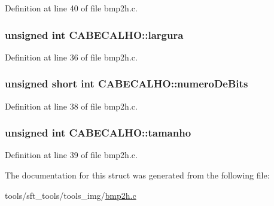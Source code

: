Definition at line 40 of file bmp2h.c.

\hypertarget{structCABECALHO_ada5c33aa4b5ea8b94f7f632e0d09a8d0}{
\subsubsection[{largura}]{\setlength{\rightskip}{0pt plus 5cm}unsigned int {\bf CABECALHO::largura}}}
\label{structCABECALHO_ada5c33aa4b5ea8b94f7f632e0d09a8d0}


Definition at line 36 of file bmp2h.c.

\hypertarget{structCABECALHO_aa02a718fcfd20a244bd95a8c0d025c72}{
\subsubsection[{numeroDeBits}]{\setlength{\rightskip}{0pt plus 5cm}unsigned short int {\bf CABECALHO::numeroDeBits}}}
\label{structCABECALHO_aa02a718fcfd20a244bd95a8c0d025c72}


Definition at line 38 of file bmp2h.c.

\hypertarget{structCABECALHO_a47b5e21a4f3f6e7c57bdcb170179d154}{
\subsubsection[{tamanho}]{\setlength{\rightskip}{0pt plus 5cm}unsigned int {\bf CABECALHO::tamanho}}}
\label{structCABECALHO_a47b5e21a4f3f6e7c57bdcb170179d154}


Definition at line 39 of file bmp2h.c.



The documentation for this struct was generated from the following file:\begin{DoxyCompactItemize}
\item 
tools/sft\_\-tools/tools\_\-img/\hyperlink{bmp2h_8c}{bmp2h.c}\end{DoxyCompactItemize}
